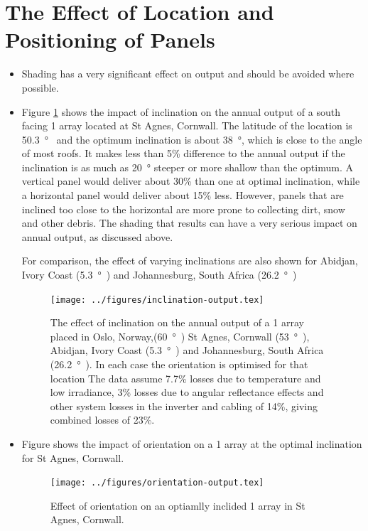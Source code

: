 \documentclass{article}
\begin{document}
\section{The Effect of Location and Positioning of Panels}
\begin{itemize}
\item Shading has a very significant effect on output and should be avoided where possible.
\item Figure \ref{fig:op-vs-inclination} shows the impact of inclination on the annual output of a south facing  \SI{1}{\kilowattpeak} array located at St Agnes, Cornwall. The latitude of the location is \SI{50.3}{\degree\north} and the optimum inclination is about \SI{38}{\degree}, which is close to the angle of most roofs. It makes less than 5\% difference to the annual output if the inclination is as much as \SI{20}{\degree} steeper or more shallow than the optimum. A vertical panel would deliver about 30\% than one at optimal inclination, while a horizontal panel would deliver about 15\% less. However, panels that are inclined too close to the horizontal are more prone to collecting dirt, snow and other debris. The shading that results can have a very serious impact on annual output, as discussed above.

For comparison, the effect of varying inclinations are also shown for Abidjan, Ivory Coast (\SI{5.3}{\degree\north}) and Johannesburg, South Africa (\SI{26.2}{\degree\south}) 


\begin{figure}
\centering
\texttt{[image: ../figures/inclination-output.tex]}
\caption{The effect of inclination on the annual output of a \SI{1}{\kilowattpeak} array placed in Oslo, Norway,(\SI{60}{\degree\north}) St Agnes, Cornwall (\SI{53}{\degree\north}), Abidjan, Ivory Coast (\SI{5.3}{\degree\north}) and Johannesburg, South Africa (\SI{26.2}{\degree\south}). In each case the orientation is optimised for that location The data assume 7.7\% losses due to temperature and low irradiance, 3\% losses due to angular reflectance effects and other system losses in the inverter and cabling of 14\%, giving combined losses of 23\%.  \cite{PVGIS}}
\label{fig:op-vs-inclination}
\end{figure}

\item Figure shows the impact of orientation on a \SI{1}{\kilowattpeak} array at the optimal inclination for St Agnes, Cornwall.

\begin{figure}
\centering
\texttt{[image: ../figures/orientation-output.tex]}
\caption{Effect of orientation on an optiamlly inclided \SI{1}{\kilowattpeak} array in St Agnes, Cornwall.  \cite{PVGIS}}
\label{fig:op-vs-orientation}
\end{figure}

\end{itemize}
\end{document}
